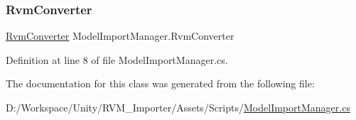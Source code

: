 \subsubsection{\texorpdfstring{RvmConverter}{RvmConverter}}
{\footnotesize\ttfamily \mbox{\hyperlink{class_rvm_converter}{Rvm\+Converter}} Model\+Import\+Manager.\+Rvm\+Converter}



Definition at line 8 of file Model\+Import\+Manager.\+cs.



The documentation for this class was generated from the following file\+:\begin{DoxyCompactItemize}
\item 
D\+:/\+Workspace/\+Unity/\+R\+V\+M\+\_\+\+Importer/\+Assets/\+Scripts/\mbox{\hyperlink{_model_import_manager_8cs}{Model\+Import\+Manager.\+cs}}\end{DoxyCompactItemize}
